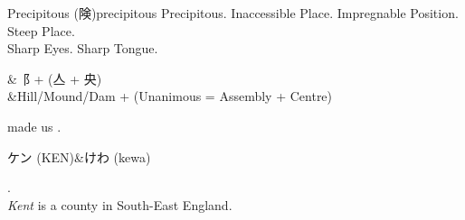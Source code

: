 \begin{glyph}{Precipitous (険)}{precipitous}\label{glyph:precipitous}
Precipitous.  Inaccessible Place.  Impregnable Position.  Steep Place.\\\hline
Sharp Eyes.  Sharp Tongue.
\end{glyph}

\begin{comps}
\comprtwocone&⻏ + (亼 + 央)\\\hline
\comprthreecone&Hill/Mound/Dam + (Unanimous = Assembly + Centre)\\\hline
{}
\end{comps}

\begin{remglyph}
  made us .\\\hline
\end{remglyph}

\begin{pronss}
ケン (KEN)&けわ (kewa)\\\hline
\end{pronss}

\begin{remprons}
 .\\\hline
{\warn}\textit{Kent} is a county in South-East England.\\\hline
\end{remprons}

